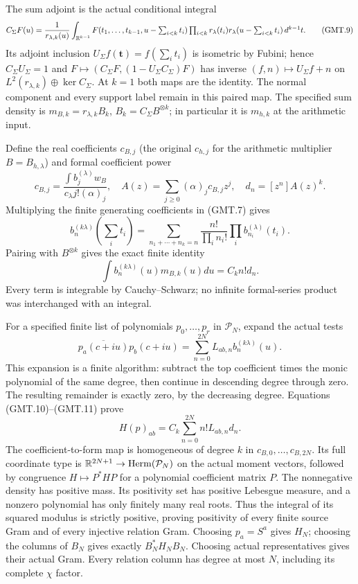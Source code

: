 The sum adjoint is the actual conditional integral
\[
 C_\Sigma F(u)=\frac{1}{r_{\lambda,k}(u)}
 \int_{\mathbb R^{k-1}}F(t_1,\ldots,t_{k-1},u-\textstyle\sum_{i<k}t_i)
 \prod_{i<k}r_\lambda(t_i)r_\lambda(u-\textstyle\sum_{i<k}t_i)
 \,d^{k-1}t.                                                    \tag{GMT.9}
\]
Its adjoint inclusion $U_\Sigma f(\mathbf t)=f(\sum_i t_i)$
is isometric by Fubini; hence $C_\Sigma U_\Sigma=1$ and
$F\mapsto(C_\Sigma F,(1-U_\Sigma C_\Sigma)F)$ has inverse
$(f,n)\mapsto U_\Sigma f+n$ on
$L^2(r_{\lambda,k})\oplus\ker C_\Sigma$. At $k=1$ both maps
are the identity. The normal component and every support label
remain in this paired map. The specified sum density is
$m_{B,k}=r_{\lambda,k}B_k$, $B_k=C_\Sigma B^{\otimes k}$;
in particular it is $m_{h,k}$ at the arithmetic input.

Define the real coefficients $c_{B,j}$ (the original $c_{h,j}$
for the arithmetic multiplier $B=B_{h,\lambda}$) and formal coefficient power
\[
 c_{B,j}=\frac{\int b_j^{(\lambda)}w_B}{c_\lambda j!(\alpha)_j},
 \quad A(z)=\sum_{j\ge0}(\alpha)_j c_{B,j}z^j,
 \quad d_n=[z^n]A(z)^k.                                        \tag{GMT.10}
\]
Multiplying the finite generating coefficients in (GMT.7) gives
\[
 b_n^{(k\lambda)}(\textstyle\sum_i t_i)=
 \sum_{n_1+\cdots+n_k=n}\frac{n!}{\prod_i n_i!}
                   \prod_i b_{n_i}^{(\lambda)}(t_i).
\]
Pairing with $B^{\otimes k}$ gives the exact finite identity
\[
 \int b_n^{(k\lambda)}(u)m_{B,k}(u)du=C_k n!d_n.                \tag{GMT.11}
\]
Every term is integrable by Cauchy--Schwarz; no infinite formal-series
product was interchanged with an integral.

For a specified finite list of polynomials $p_0,\ldots,p_r$ in
$\mathcal P_N$, expand the actual tests
\[
 \overline{p_a(c+iu)}p_b(c+iu)
       =\sum_{n=0}^{2N}L_{ab,n}b_n^{(k\lambda)}(u).
\]
This expansion is a finite algorithm: subtract the top coefficient
times the monic polynomial of the same degree, then continue in
descending degree through zero. The resulting remainder is exactly
zero, by the decreasing degree. Equations (GMT.10)--(GMT.11) prove
\[
 \boxed{H(p)_{ab}=C_k\sum_{n=0}^{2N}n!L_{ab,n}d_n.}            \tag{GMT.12}
\]
The coefficient-to-form map is homogeneous of degree $k$ in
$c_{B,0},\ldots,c_{B,2N}$. Its full coordinate type is
$\mathbb R^{2N+1}\to\operatorname{Herm}(\mathcal P_N)$ on the actual
moment vectors, followed by congruence $H\mapsto P^*HP$ for a
polynomial coefficient matrix $P$. The nonnegative density has positive
mass. Its positivity set has positive Lebesgue measure, and a nonzero
polynomial has only finitely many real roots. Thus the integral of its
squared modulus is strictly positive, proving positivity of every finite
source Gram and of every injective relation Gram. Choosing $p_a=S^a$ gives
$H_N$; choosing the columns of $B_N$ gives exactly $B_N^*H_NB_N$.
Choosing actual representatives gives their actual Gram. Every relation
column has degree at most $N$, including its complete $\chi$ factor.

